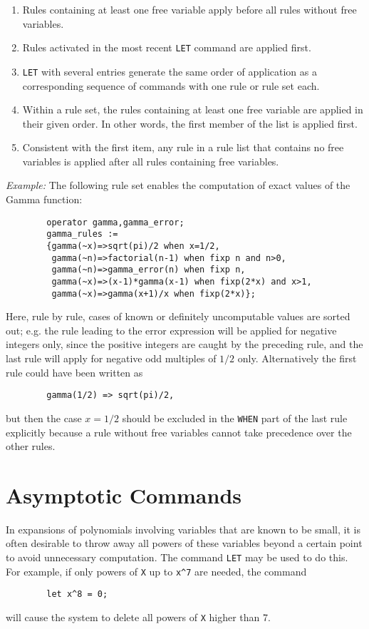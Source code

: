 \begin{enumerate}
\item Rules containing at least one free variable apply before all rules
without free variables.
\item Rules activated in the most recent \texttt{LET}
command are applied first.
\item \texttt{LET} with several entries generate
the same order of application as a corresponding sequence of commands with
one rule or rule set each.
\item Within a rule set, the rules containing at least
one free variable are applied in their given order.
In other words, the first member of the list is applied first.
\item Consistent with the first item, any rule in a rule list that
contains no free variables is applied after all rules containing free
variables.
\end{enumerate}
\textit{Example:} The following rule set enables the computation of exact
values of the Gamma function:
\begin{verbatim}
        operator gamma,gamma_error;
        gamma_rules :=
        {gamma(~x)=>sqrt(pi)/2 when x=1/2,
         gamma(~n)=>factorial(n-1) when fixp n and n>0,
         gamma(~n)=>gamma_error(n) when fixp n,
         gamma(~x)=>(x-1)*gamma(x-1) when fixp(2*x) and x>1,
         gamma(~x)=>gamma(x+1)/x when fixp(2*x)};
\end{verbatim}
Here, rule by rule, cases of known or definitely uncomputable values
are sorted out; e.g. the rule leading to the error expression
will be applied for negative integers only, since the positive
integers are caught by the preceding rule, and the
last rule will apply for negative odd multiples of $1/2$ only.
Alternatively the first rule could have been written as
\begin{verbatim}
        gamma(1/2) => sqrt(pi)/2,
\end{verbatim}
but then the case $x=1/2$ should be excluded in the \texttt{WHEN} part of the
last rule explicitly because a rule without free variables cannot take
precedence over the other rules.

\section{Asymptotic Commands} 
\label{sec-asymp}
In expansions of polynomials involving variables that are known to be
small, it is often desirable to throw away all powers of these variables
beyond a certain point to avoid unnecessary computation.  The command 
\texttt{LET} may be used to do this.  For example, if only powers of \texttt{X} up to
\texttt{x\textasciicircum 7} are needed, the command
\begin{verbatim}
        let x^8 = 0;
\end{verbatim}
will cause the system to delete all powers of \texttt{X} higher than 7.

